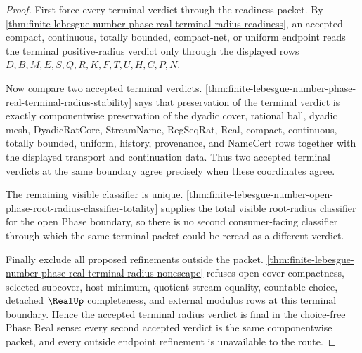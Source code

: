 \begin{proof}
First force every terminal verdict through the readiness packet. By \autoref{thm:finite-lebesgue-number-phase-real-terminal-radius-readiness}, an accepted compact, continuous, totally bounded, compact-net, or uniform endpoint reads the terminal positive-radius verdict only through the displayed rows $D,B,M,E,S,Q,R,K,F,T,U,H,C,P,N$.

Now compare two accepted terminal verdicts. \autoref{thm:finite-lebesgue-number-phase-real-terminal-radius-stability} says that preservation of the terminal verdict is exactly componentwise preservation of the dyadic cover, rational ball, dyadic mesh, DyadicRatCore, StreamName, RegSeqRat, Real, compact, continuous, totally bounded, uniform, history, provenance, and NameCert rows together with the displayed transport and continuation data. Thus two accepted terminal verdicts at the same boundary agree precisely when these coordinates agree.

The remaining visible classifier is unique. \autoref{thm:finite-lebesgue-number-open-phase-root-radius-classifier-totality} supplies the total visible root-radius classifier for the open Phase boundary, so there is no second consumer-facing classifier through which the same terminal packet could be reread as a different verdict.

Finally exclude all proposed refinements outside the packet. \autoref{thm:finite-lebesgue-number-phase-real-terminal-radius-nonescape} refuses open-cover compactness, selected subcover, host minimum, quotient stream equality, countable choice, detached $\RealUp$ completeness, and external modulus rows at this terminal boundary. Hence the accepted terminal radius verdict is final in the choice-free Phase Real sense: every second accepted verdict is the same componentwise packet, and every outside endpoint refinement is unavailable to the route.
\end{proof}
